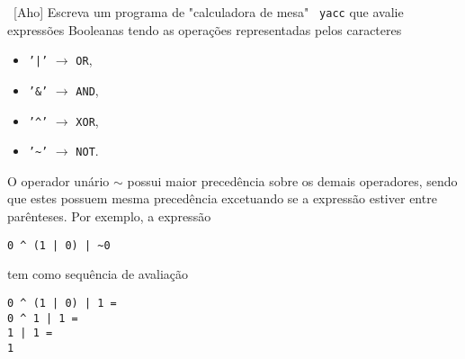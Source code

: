 
\newexerc~[Aho] Escreva um programa de "calculadora de mesa" {\tt
  yacc} que avalie expressões Booleanas tendo as operações
representadas pelos caracteres

\begin{itemize}
\item {\tt '|'} $\rightarrow$ {\tt OR},
\item {\tt '\&'} $\rightarrow$ {\tt AND},
\item {\tt '\^{ }'} $\rightarrow$ {\tt XOR},
\item {\tt '\textasciitilde'} $\rightarrow$ {\tt NOT}.
\end{itemize}

\noindent O operador unário $\sim$ possui maior
precedência sobre os demais operadores, sendo que estes possuem mesma
precedência excetuando se a expressão estiver entre parênteses. Por
exemplo, a expressão

\begin{verbatim}
0 ^ (1 | 0) | ~0
\end{verbatim}

\noindent tem como sequência de avaliação

\begin{verbatim}
0 ^ (1 | 0) | 1 =
0 ^ 1 | 1 =
1 | 1 =
1
\end{verbatim}

